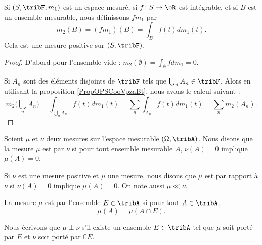 \begin{proposition}
    Si \( (S,\tribF,m_1)\) est un espace mesuré, si \( f\colon S\to \eR\) est intégrable, et si \( B\) est un ensemble mesurable, nous définissons \( fm_1\) par
    \begin{equation}
        m_2(B)=(fm_1)(B)=\int_Bf(t)dm_1(t).
    \end{equation}
    Cela est une mesure positive sur \( (S,\tribF)\).
\end{proposition}

\begin{proof}
    D'abord pour l'ensemble vide : \( m_2(\emptyset)=\int_{\emptyset}fdm_1=0\).

    Si \( A_n\) sont des éléments disjoints de \( \tribF\) tels que \( \bigcup_nA_n\in\tribF\). Alors en utilisant la proposition \ref{PropOPSCooVpzaBt}, nous avons le calcul suivant :
    \begin{equation}
        m_2\big( \bigcup_nA_n \big)=\int_{\bigcup_nA_n}f(t)dm_1(t)=\sum_{n}\int_{A_n}f(t)dm_1(t)=\sum_nm_2(A_n).
    \end{equation}
\end{proof}

\begin{definition}
    Soient \( \mu\) et \( \nu\) deux mesures sur l'espace mesurable \( (\Omega,\tribA)\). Nous disons que la mesure \( \mu\) est  par \( \nu\) si pour tout ensemble mesurable \( A\), \( \nu(A)=0\) implique \( \mu(A)=0\).

    Si \( \nu\) est une mesure positive et \( \mu\) une mesure, nous disons que \( \mu\) est  par rapport à \( \nu\) si \( \nu(A)=0\) implique \( \mu(A)=0\). On note aussi \( \mu\ll\nu\).
\end{definition}

La mesure \( \mu\) est  par l'ensemble \( E\in\tribA\) si pour tout \( A\in\tribA\), 
\begin{equation}
    \mu(A)=\mu(A\cap E).
\end{equation}

Nous écrivons que \( \mu\perp\nu\) s'il existe un ensemble \( E\in\tribA\) tel que \( \mu\) soit porté par \( E\) et \( \nu\) soit porté par \( \complement E\).

